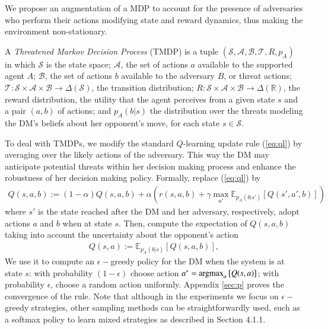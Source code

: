 We propose an augmentation of a MDP
to account for the presence of adversaries who perform their
actions modifying state and reward dynamics, thus making the environment non-stationary.
\begin{definition}
A \emph{Threatened Markov Decision Process} (TMDP) is a tuple
$\left( \mathcal{S}, \mathcal{A}, \mathcal{B}, \mathcal{T}, R, p_A \right) $
in which $\mathcal{S}$ is the state space; $\mathcal{A}$, the set of
actions $a$ available to the supported agent $A$; $\mathcal{B}$, the set of
actions $b$ 
available to the adversary $B$, or threat actions; 
$\mathcal{T}: \mathcal{S} \times \mathcal{A} 
\times \mathcal{B} \rightarrow \Delta(\mathcal{S})$, the 
transition distribution; 
$R : \mathcal{S} \times \mathcal{A} \times \mathcal{B} \rightarrow
\Delta(\mathbb{R}) $, the reward distribution, the utility that 
the agent perceives from a given state $s$ and a pair
$(a,b)$ of actions; and $p_A (b | s)$ the
 distribution over the threats modeling 
 the DM's beliefs about
her opponent's move, for each state $s \in \mathcal{S}$.
\end{definition}
\noindent 
 To deal with TMDPs, we modify the standard $Q$-learning update rule (\ref{eq:ql}) by averaging over
 the likely actions of the adversary. This way the DM may anticipate potential threats within her
 decision making process and enhance the robustness of her decision making policy. Formally, replace (\ref{eq:ql})  by 
\begin{align}\label{eq:lr}
Q(s, a, b) := (1 - \alpha)Q(s, a, b) +  \alpha \left( r(s,a,b)
+ \gamma \max_{a'} \mathbb{E}_{p_A(b|s')} \left[ Q(s',a',b)  \right]  \right)
\end{align}
where $s'$ is the state reached after the DM and her adversary, respectively, adopt actions $a$ and $b$ when at state  $s$. Then, compute the 
expectation of $Q(s,a,b)$ taking into account the
uncertainty about  the opponent's action 
\begin{align}\label{eq:lr2}
Q(s,a) := \mathbb{E}_{p_A(b|s)} \left[ Q(s,a,b) \right], 
\end{align}
We use it to compute an $\epsilon-$greedy policy for the DM when the system is at state $s$: with probability $(1-\epsilon)$ choose action
$a^* = \operatorname*{argmax}_a  \left[ Q(s,a)  \right] $; with probability $\epsilon$,
choose a random action uniformly. Appendix \ref{sec:p} proves the convergence
of the rule. Note that although in the experiments we focus on $\epsilon-$greedy strategies, other sampling methods can be straightforwardly used, such as a softmax policy to learn mixed strategies as described in Section 4.1.1.


